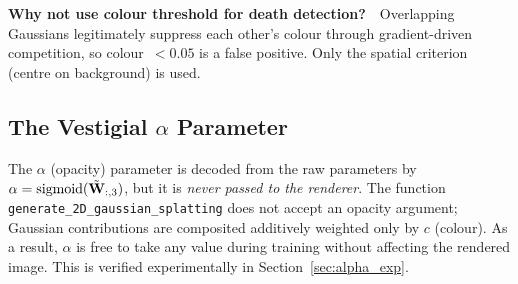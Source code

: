 \noindent
\textbf{Why not use colour threshold for death detection?}\ \
Overlapping Gaussians legitimately suppress each other's colour through
gradient-driven competition, so colour~$<0.05$ is a false positive.
Only the spatial criterion (centre on background) is used.

\subsection{The Vestigial \texorpdfstring{$\alpha$}{alpha} Parameter}
\label{sec:alpha}

The $\alpha$ (opacity) parameter is decoded from the raw parameters by
$\alpha = \operatorname{sigmoid}(\tilde{\mathbf{W}}_{:,3})$, but it is \emph{never passed to the renderer}.
The function \texttt{generate\_2D\_gaussian\_splatting} does not accept an opacity
argument; Gaussian contributions are composited additively weighted only by $c$
(colour).
As a result, $\alpha$ is free to take any value during training without affecting
the rendered image.
This is verified experimentally in Section~\ref{sec:alpha_exp}.
